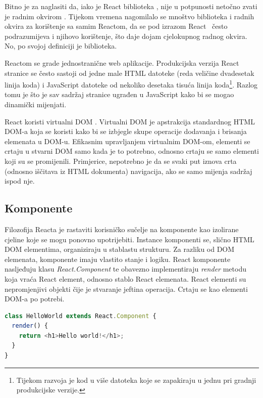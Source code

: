 \documentclass[times, utf8, zavrsni, numeric]{fer}
\newcommand{\razmakp}{\vspace{18pt}}
\newcommand{\razmaks}{\vspace{10pt}}
\begin{document}
Bitno je za naglasiti da, iako je React biblioteka , nije u potpunosti netočno zvati je radnim okvirom .
Tijekom vremena nagomilalo se mnoštvo biblioteka i radnih okvira za korištenje sa samim Reactom, da se pod izrazom \glqq React\grqq ~ često podrazumijeva i njihovo korištenje, što daje dojam cjelokupnog radnog okvira.
No, po svojoj definiciji je biblioteka\citep{reactGithub}.

\razmakp

Reactom se grade jednostranične  web aplikacije.
Produkcijska verzija React stranice se često sastoji od jedne male HTML datoteke (reda veličine dvadesetak linija koda) i JavaScript datoteke od nekoliko desetaka tisuća linija koda\footnote{Tijekom razvoja je kod u više datoteka koje se zapakiraju u jednu pri gradnji produkcijske verzije.}.
Razlog tomu je što je sav sadržaj stranice ugrađen u JavaScript kako bi se mogao dinamički mijenjati.

React koristi virtualni DOM .
Virtualni DOM je apstrakcija standardnog HTML DOM-a koja se koristi kako bi se izbjegle skupe operacije dodavanja i brisanja elemenata u DOM-u.
Efikasnim upravljanjem virtualnim DOM-om, elementi se crtaju u stvarni DOM samo kada je to potrebno, odnosno crtaju se samo elementi koji su se promijenili.
Primjerice, nepotrebno je da se svaki put iznova crta (odnosno iščitava iz HTML dokumenta) navigacija, ako se samo mijenja sadržaj ispod nje.

\razmakp


\subsection{Komponente} \label{sec:components}

Filozofija Reacta je rastaviti korisničko sučelje na komponente kao izolirane cjeline koje se mogu ponovno upotrijebiti\citep{react}.
Instance komponenti se, slično HTML DOM elementima, organiziraju u stablastu strukturu.
Za razliku od DOM elemenata, komponente imaju vlastito stanje i logiku.
React komponente nasljeđuju klasu \emph{React.Component} te obavezno implementiraju \emph{render} metodu koja vraća React element, odnosno stablo React elemenata\citep{reactDocsComponent}.
React elementi su nepromjenjivi objekti čije je stvaranje jeftina operacija.
Crtaju se kao elementi DOM-a po potrebi\citep{reactDocsRenderElem}.

\razmakp
\begin{lstlisting}[language=JavaScript, caption={Primjer komponente}, label={lst:component_example}]
class HelloWorld extends React.Component {
  render() {
    return <h1>Hello world!</h1>;
  }
}
\end{lstlisting}
\razmaks
\end{document}
